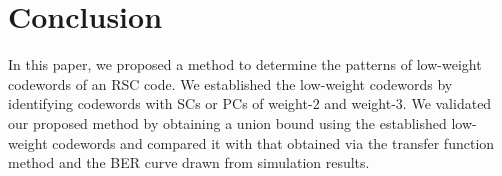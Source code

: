 \section{Conclusion}
\label{sec6}
In this paper, we proposed a method to determine the patterns of low-weight codewords of an RSC code. We established the low-weight codewords by identifying codewords with SCs or PCs of weight-$2$ and weight-$3$. We validated our proposed method by obtaining a union bound using the established low-weight codewords and compared it with that obtained via the transfer function method and the BER curve drawn from simulation results.
